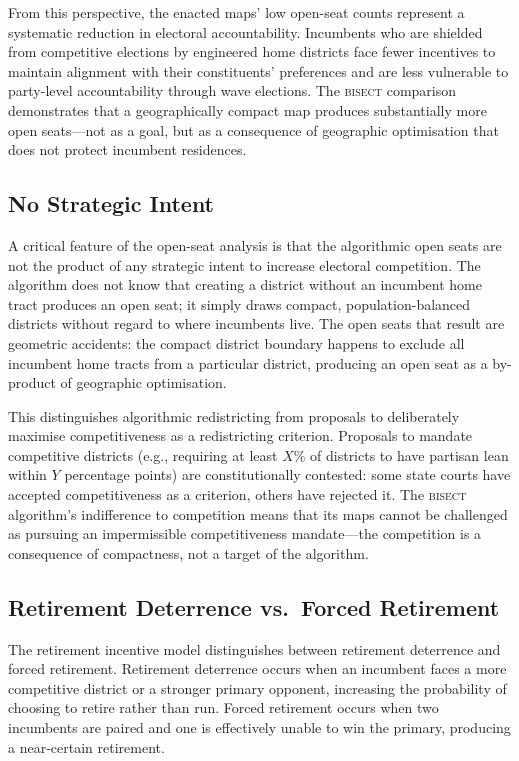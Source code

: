 From this perspective, the enacted maps' low open-seat counts represent a systematic
reduction in electoral accountability. Incumbents who are shielded from competitive
elections by engineered home districts face fewer incentives to maintain alignment
with their constituents' preferences and are less vulnerable to party-level accountability
through wave elections. The \textsc{bisect} comparison demonstrates that a geographically
compact map produces substantially more open seats---not as a goal, but as a consequence
of geographic optimisation that does not protect incumbent residences.

\subsection{No Strategic Intent}

A critical feature of the open-seat analysis is that the algorithmic open seats are
not the product of any strategic intent to increase electoral competition. The algorithm
does not know that creating a district without an incumbent home tract produces an open
seat; it simply draws compact, population-balanced districts without regard to where
incumbents live. The open seats that result are geometric accidents: the compact district
boundary happens to exclude all incumbent home tracts from a particular district,
producing an open seat as a by-product of geographic optimisation.

This distinguishes algorithmic redistricting from proposals to deliberately maximise
competitiveness as a redistricting criterion. Proposals to mandate competitive districts
(e.g., requiring at least $X\%$ of districts to have partisan lean within $Y$ percentage
points) are constitutionally contested: some state courts have accepted competitiveness
as a criterion, others have rejected it. The \textsc{bisect} algorithm's indifference
to competition means that its maps cannot be challenged as pursuing an impermissible
competitiveness mandate---the competition is a consequence of compactness, not a target
of the algorithm.

\subsection{Retirement Deterrence vs.\ Forced Retirement}

The retirement incentive model distinguishes between retirement deterrence and forced
retirement. Retirement deterrence occurs when an incumbent faces a more competitive
district or a stronger primary opponent, increasing the probability of choosing to
retire rather than run. Forced retirement occurs when two incumbents are paired and one
is effectively unable to win the primary, producing a near-certain retirement.

